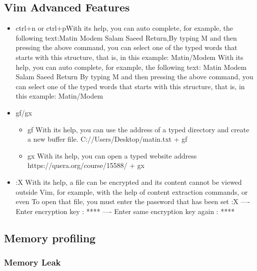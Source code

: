 \documentclass[12pt]{article}
\begin{document}
\subsection{Vim Advanced Features}
\begin{itemize}
  \item ctrl+n   or  ctrl+p\newline With its help, you can auto complete, for example, the following text:\newline Matin Modem Salam Saeed Return,By typing {M} and then pressing the above command, you can select one of the typed words that starts with this structure, that is, in this example:\newline
  Matin/Modem\newline
  With its help, you can auto complete, for example, the following text:\newline
Matin Modem Salam Saeed Return
By typing {M} and then pressing the above command, you can select one of the typed words that starts with this structure, that is, in this example:
Matin/Modem
  \item gf/gx
      \begin{itemize}
        \item gf
        With its help, you can use the address of a typed directory and create a new buffer file.\newline
        C://Users/Desktop/matin.txt + {gf}
        \item gx
        With its help, you can open a typed website address\newline
        https://quera.org/course/15588/ + {gx}
      \end{itemize}



  \item :X\newline
  With its help, a file can be encrypted and its content cannot be viewed outside Vim, for example, with the help of content extraction commands, or even
  To open that file, you must enter the password that has been set\newline
  :X    ----   Enter encryption key : ****   ----  Enter same encryption key again : ****
\end{itemize}

\subsection{Memory profiling}
\subsubsection{Memory Leak}
\end{document}
